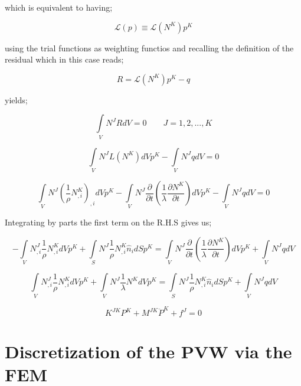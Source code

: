 which is equivalent to having;

\[\mathcal{L}(p) \equiv \mathcal{L}({N^K}){p^K}\]

using the trial functions as weighting functios and recalling the definition of the residual which in this case reads;

\[R = \mathcal{L}({N^K}){p^K} - q\]

yields;

\[\int\limits_V {{N^J}RdV = 0} \quad \quad J=1,2,...,K \]

\[\int\limits_V {{N^J}L({N^K})dV{p^K}}  - \int\limits_V {{N^J}qdV}  = 0\]

\[\int\limits_V {{N^J}{{\left( {\frac{1}{\rho }N_{,i}^K} \right)}_{,i}}dV{p^K} - \int\limits_V {{N^J}\frac{\partial }{{\partial t}}\left( {\frac{1}{\lambda }\frac{{\partial {N^K}}}{{\partial t}}} \right)dV{p^K}} }  - \int\limits_V {{N^J}qdV}  = 0\]

Integrating by parts the first term on the R.H.S gives us;

\[ - \int\limits_V {N_{,i}^J\frac{1}{\rho }N_{,i}^KdV} {p^K} + \int\limits_S {{N^J}\frac{1}{\rho }N_{,i}^K{{\hat n}_i}dS{p^K}}  = \int\limits_V {{N^J}\frac{\partial }{{\partial t}}\left( {\frac{1}{\lambda }\frac{{\partial {N^K}}}{{\partial t}}} \right)dV{p^K}}  + \int\limits_V {{N^J}qdV} \]

\[\int\limits_V {N_{,i}^J\frac{1}{\rho }N_{,i}^KdV} {p^K} + \int\limits_V {{N^J}\frac{1}{\lambda }{N^K}dV{{\ddot p}^K}}  = \int\limits_S {{N^J}\frac{1}{\rho }N_{,i}^K{{\hat n}_i}dS{p^K}}  + \int\limits_V {{N^J}qdV} \]

\[{K^{JK}}{P^K} + {M^{JK}}{{\ddot P}^K} + {f^J} = 0\]


\section[Discretization of the PVW using FEM]{Discretization of the PVW via the FEM}

